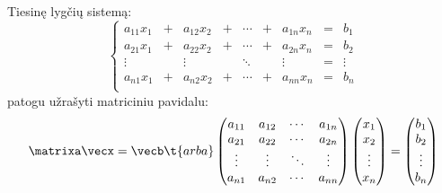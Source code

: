 



Tiesinę lygčių sistemą:
\begin{equation*}
  \left\{
    \begin{array}{ccccccccc}
      a_{11}x_{1} &+& a_{12}x_{2} &+& \cdots &+& a_{1n}x_{n} &=& b_{1} \\
      a_{21}x_{1} &+& a_{22}x_{2} &+& \cdots &+& a_{2n}x_{n} &=& b_{2} \\
      \vdots & & \vdots & & \ddots & & \vdots &=& \vdots \\
      a_{n1}x_{1} &+& a_{n2}x_{2} &+& \cdots &+& a_{nn}x_{n} &=& b_{n} \\
    \end{array}
  \right.
\end{equation*}
patogu užrašyti matriciniu pavidalu:
\begin{equation*}
  \matrixa \vecx = \vecb
  \t{arba} 
  \begin{pmatrix}
    a_{11} & a_{12} & \cdots & a_{1n} \\
    a_{21} & a_{22} & \cdots & a_{2n} \\
    \vdots & \vdots & \ddots & \vdots \\
    a_{n1} & a_{n2} & \cdots & a_{nn} \\
  \end{pmatrix}
  \begin{pmatrix}
    x_{1} \\
    x_{2} \\
    \vdots \\
    x_{n} \\
  \end{pmatrix}
  =
  \begin{pmatrix}
    b_{1} \\
    b_{2} \\
    \vdots \\
    b_{n} \\
  \end{pmatrix}
\end{equation*}

